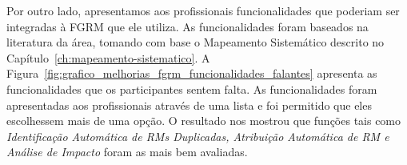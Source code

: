 Por outro lado, apresentamos aos profissionais funcionalidades que poderiam ser
integradas à FGRM que ele utiliza. As funcionalidades foram baseados na
literatura da área, tomando com base o Mapeamento Sistemático descrito no
Capítulo~\ref{ch:mapeamento-sistematico}. A
Figura~\ref{fig:grafico_melhorias_fgrm_funcionalidades_falantes} apresenta as
funcionalidades que os participantes sentem falta. As funcionalidades foram
apresentadas aos profissionais através de uma lista e foi permitido que eles
escolhessem mais de uma opção. O resultado nos mostrou que funções tais como
\textit{Identificação Automática de RMs Duplicadas, Atribuição Automática de RM
    e Análise de Impacto} foram as mais bem avaliadas.



